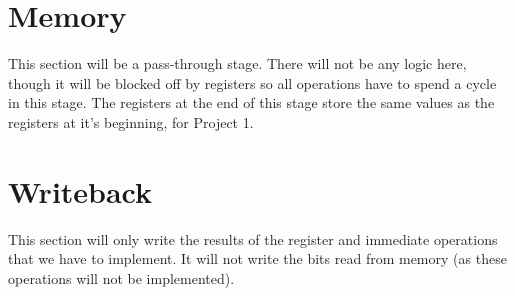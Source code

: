\documentclass{article}
\begin{document}
\section*{Memory}
This section will be a pass-through stage. There will not be any logic here, though it will be blocked off by registers so all operations have to spend a cycle in this stage. The registers at the end of this stage store the same values as the registers at it's beginning, for Project 1. 

\section*{Writeback}
This section will only write the results of the register and immediate operations that we have to implement.  It will not write the bits read from memory (as these operations will not be implemented).
\end{document}
